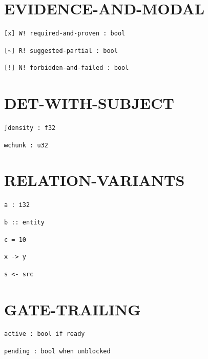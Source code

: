 \documentclass[11pt]{article}
\begin{document}
\section{EVIDENCE-AND-MODAL}\label{sec:evidence-and-modal}
\begin{lstlisting}[language=csl]
[x] W! required-and-proven : bool
\end{lstlisting}
\begin{lstlisting}[language=csl]
[~] R! suggested-partial : bool
\end{lstlisting}
\begin{lstlisting}[language=csl]
[!] N! forbidden-and-failed : bool
\end{lstlisting}
\section{DET-WITH-SUBJECT}\label{sec:det-with-subject}
\begin{lstlisting}[language=csl]
∫density : f32
\end{lstlisting}
\begin{lstlisting}[language=csl]
⊞chunk : u32
\end{lstlisting}
\section{RELATION-VARIANTS}\label{sec:relation-variants}
\begin{lstlisting}[language=csl]
a : i32
\end{lstlisting}
\begin{lstlisting}[language=csl]
b :: entity
\end{lstlisting}
\begin{lstlisting}[language=csl]
c = 10
\end{lstlisting}
\begin{lstlisting}[language=csl]
x -> y
\end{lstlisting}
\begin{lstlisting}[language=csl]
s <- src
\end{lstlisting}
\section{GATE-TRAILING}\label{sec:gate-trailing}
\begin{lstlisting}[language=csl]
active : bool if ready
\end{lstlisting}
\begin{lstlisting}[language=csl]
pending : bool when unblocked
\end{lstlisting}
\end{document}
